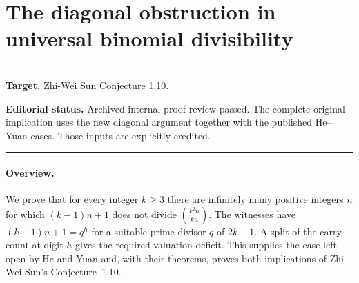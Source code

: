 \documentclass[11pt,a4paper]{article}
\begin{document}
\clearpage

\section{The diagonal obstruction in universal binomial divisibility}
\label{section:R19K}
\\[3pt]
\noindent\textbf{Target.} Zhi-Wei Sun Conjecture 1.10.

\noindent\textbf{Editorial status.} Archived internal proof review passed. The complete original implication uses the new diagonal argument together with the published He--Yuan cases. Those inputs are explicitly credited.

\smallskip\hrule\medskip



\begingroup
\newcommand{\vp}{v_q}
\setcounter{equation}{0}
\renewcommand{\theequation}{\thesection.\arabic{equation}}
\renewcommand{\theHequation}{R19K.\arabic{equation}}
\paragraph{Overview.}
We prove that for every integer $k\ge3$ there are infinitely many
positive integers $n$ for which $(k-1)n+1$ does not divide
$\binom{k^2n}{kn}$. The witnesses have $(k-1)n+1=q^h$ for a suitable
prime divisor $q$ of $2k-1$. A split of the carry count at digit $h$
gives the required valuation deficit. This supplies the case left open
by He and Yuan and, with their theorems, proves both implications of
Zhi-Wei Sun's Conjecture~1.10.
\end{document}
